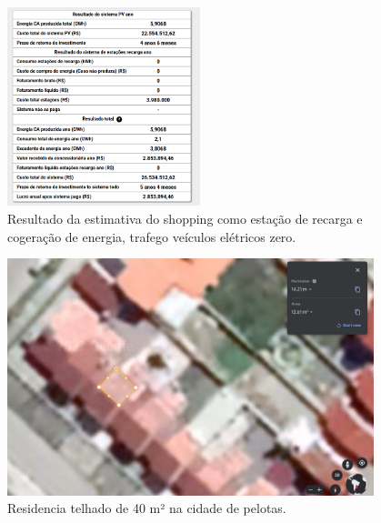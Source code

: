 \documentclass{beamer}
\begin{document}
\begin{frame}

\begin{figure}[H]
    \centering
    \includegraphics[width=0.5\textwidth]{./Figuras/shopping_7.png}
    \caption{Resultado da estimativa do shopping como estação de recarga e cogeração de energia, trafego veículos elétricos zero.}
   \label{fig:shopping_7}

\end{figure}
\end{frame}

\begin{frame}

\begin{figure}[H]
    \centering
    \includegraphics[width=0.95\textwidth]{./Figuras/casa_minha.png}
    \caption{Residencia telhado de 40 m² na cidade de pelotas.}
   \label{fig:casa_minha}
\end{figure}

\end{frame}
\end{document}
